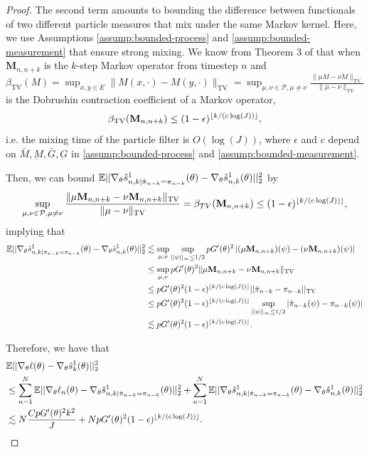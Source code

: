 \documentclass{article}
\begin{document}
\begin{proof}
The second term amounts to bounding the difference between functionals of two different particle measures that mix under the same Markov kernel. Here, we use Assumptions \ref{assump:bounded-process} and \ref{assump:bounded-measurement} that ensure strong mixing. We know from Theorem 3 of \cite{karjalainen2023} that when $\textbf{M}_{n,n+k}$ is the $k$-step Markov operator from timestep $n$ and $\beta_{\text{TV}}(M) = \sup _{x, y \in E}\|M(x, \cdot)-M(y, \cdot)\|_{\mathrm{TV}}=\sup _{\mu, \nu \in \mathcal{P}, \mu \neq \nu} \frac{\|\mu M-\nu M\|_{\mathrm{TV}}}{\|\mu-\nu\|_{\mathrm{TV}}}$ is the Dobrushin contraction coefficient of a Markov operator, 
$$\beta_{\text{TV}}(\textbf{M}_{n,n+k}) \leq (1-\epsilon)^{\lfloor k/(c\log(J)) \rfloor},$$
i.e. the mixing time of the particle filter is $O(\log(J))$, where $\epsilon$ and $c$ depend on $\bar{M}, \underbar{M}, \bar{G}, \underbar{G}$ in \ref{assump:bounded-process} and \ref{assump:bounded-measurement}. 

Then, we can bound 
$\mathbb{E}||\nabla_\theta\hat s_{n,k|\hat\pi_{n-k}=\pi_{n-k}}^1(\theta) - \nabla_\theta\hat s_{n,k}^1(\theta)||_2^2$ by
$$\sup _{\mu, \nu \in \mathcal{P}, \mu \neq \nu} \frac{\|\mu \textbf{M}_{n,n+k}-\nu \textbf{M}_{n,n+k}\|_{\mathrm{TV}}}{\|\mu-\nu\|_{\mathrm{TV}}} = \beta_{TV}(\textbf{M}_{n,n+k}) \leq (1-\epsilon)^{\lfloor k/(c\log(J)) \rfloor},$$
implying that
\begin{align*}
    \mathbb{E}||\nabla_\theta\hat s_{n,k|\hat\pi_{n-k}=\pi_{n-k}}^1(\theta) - \nabla_\theta\hat s_{n,k}^1(\theta)||_2^2 
    &\lesssim \sup_{\mu, \nu} \sup_{||\psi||_\infty \leq 1/2} pG'(\theta)^2\left|(\mu \textbf{M}_{n,n+k})(\psi)-(\nu \textbf{M}_{n,n+k})(\psi)\right| \\
    &\leq \sup_{\mu, \nu} pG'(\theta)^2\|\mu \textbf{M}_{n,n+k}-\nu \textbf{M}_{n,n+k}\|_{\mathrm{TV}} \\
    &\leq pG'(\theta)^2(1-\epsilon)^{\lfloor k/(c\log(J)) \rfloor} ||\hat\pi_{n-k} - \pi_{n-k}||_{\text{TV}} \\
    &\leq pG'(\theta)^2(1-\epsilon)^{\lfloor k/(c\log(J)) \rfloor} \sup_{||\psi||_{\infty} \leq 1/2} |\hat\pi_{n-k}(\psi) - \pi_{n-k}(\psi)| \\
    &\lesssim pG'(\theta)^2(1-\epsilon)^{\lfloor k/(c\log(J)) \rfloor}.
\end{align*}

Therefore, we have that
\begin{align*}
    &\mathbb{E}||\nabla_\theta\ell(\theta) - \nabla_\theta\hat s_k^1(\theta)||_2^2 \\
    &\leq \sum_{n=1}^N \mathbb{E}||\nabla_\theta\ell_n(\theta) - \nabla_\theta\hat s_{n,k|\hat\pi_{n-k}=\pi_{n-k}}^1(\theta)||_2^2 + \sum_{n=1}^N \mathbb{E}||\nabla_\theta\hat s_{n,k|\hat\pi_{n-k}=\pi_{n-k}}^1(\theta) - \nabla_\theta\hat s_{n,k}^1(\theta)||_2^2\\
    &\lesssim N\frac{CpG'(\theta)^2k^2}{J} + NpG'(\theta)^2(1-\epsilon)^{\lfloor k/(c\log(J)) \rfloor}.
\end{align*}





\end{proof}
\end{document}
